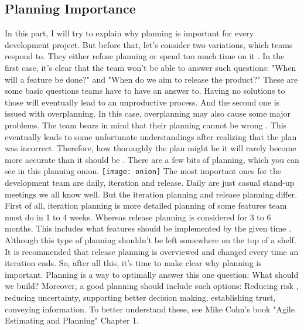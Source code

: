 \documentclass{scrartcl}
\begin{document}
\begin{multicols}{2}
\section{Planning Importance}
In this part, I will try to explain why planning is important for every development project.
But before that, let's consider two variations, which teams respond to.
They either refuse planning or spend too much time on it \cite{cohn2005agile}.
In the first case, it's clear that the team won't be able to answer such questions:
"When will a feature be done?" and "When do we aim to release the product?"
These are some basic questions teams have to have an answer to.
Having no solutions to those will eventually lead to an unproductive process.
And the second one is issued with overplanning.
In this case, overplanning may also cause some major problems.
The team bears in mind that their planning cannot be wrong \cite{cohn2005agile}.
This eventually leads to some unfortunate understandings after realizing that the plan was incorrect.
Therefore, how thoroughly the plan might be it will rarely become more accurate than it should be \cite{cohn2005agile}.
There are a few bits of planning, which you can see in this planning onion.
\texttt{[image: onion]}
The most important ones for the development team are daily, iteration and release.
Daily are just casual stand-up meetings we all know well.
But the iteration planning and release planning differ.
First of all, iteration planning is more detailed planning of some features team must do in 1 to 4 weeks.
Whereas release planning is considered for 3 to 6 months.
This includes what features should be implemented by the given time \cite{grenning2002planning}.
Although this type of planning shouldn't be left somewhere on the top of a shelf.
It is recommended that release planning is overviewed and changed every time an iteration ends.
So, after all this, it's time to make clear why planning is important.
Planning is a way to optimally answer this one question: What should we build? \cite{cohn2005agile}
Moreover, a good planning should include such options:
Reducing risk \cite{grapenthin2016supporting}, reducing uncertainty, supporting better decision making, establishing trust, conveying information.
To better understand these, see Mike Cohn's book "Agile Estimating and Planning" Chapter 1.


\end{multicols}
\end{document}
